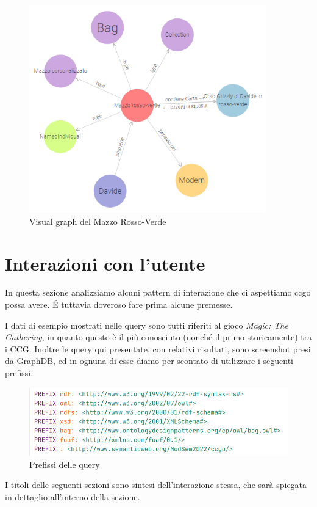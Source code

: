 \documentclass[12pt]{article}
\begin{document}
\begin{figure}[H]
    \centering
    \includegraphics[height=9cm]{files/grafo_mazzo.png}
    \caption{Visual graph del Mazzo Rosso-Verde}
    \label{fig:grafo_mazzo}
\end{figure}




\newpage
\section{Interazioni con l'utente}
In questa sezione analizziamo alcuni pattern di interazione che ci aspettiamo ccgo possa avere. \'E tuttavia doveroso fare prima alcune premesse.

I dati di esempio mostrati nelle query sono tutti riferiti al gioco \textit{Magic: The Gathering}, in quanto questo è il più conosciuto (nonché il primo storicamente) tra i CCG. Inoltre le query qui presentate, con relativi risultati, sono screenshot presi da GraphDB, ed in ognuna di esse diamo per scontato di utilizzare i seguenti prefissi.
\begin{figure}[H]
    \includegraphics[width=14cm]{files/prefissi_query.png}
    \caption{Prefissi delle query}
    \label{fig:prefissi_query}
\end{figure}

I titoli delle seguenti sezioni sono sintesi dell'interazione stessa, che sarà spiegata in dettaglio all'interno della sezione.
\end{document}
